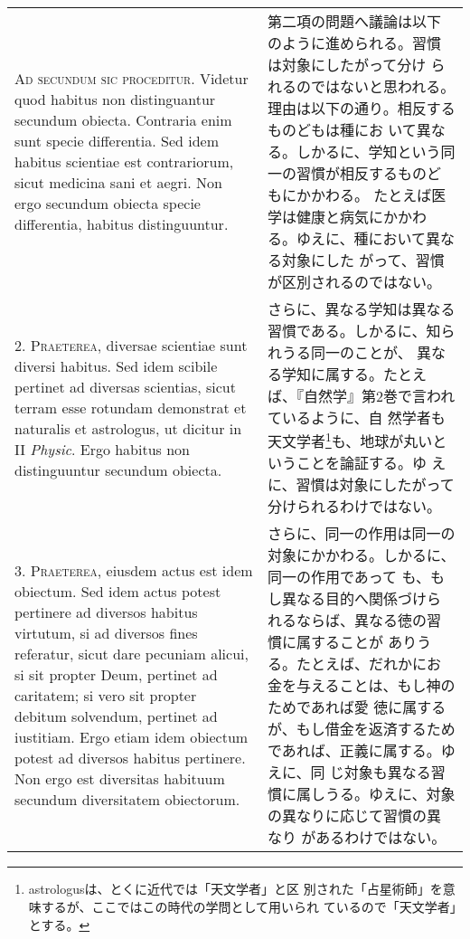 \documentclass[10pt]{jsarticle}
\begin{document}
\begin{longtable}{p{21em}p{21em}}

{\scshape Ad secundum sic proceditur}. Videtur quod habitus non
distinguantur secundum obiecta. Contraria enim sunt specie
differentia. Sed idem habitus scientiae est contrariorum, sicut
medicina sani et aegri. Non ergo secundum obiecta specie differentia,
habitus distinguuntur.

&

第二項の問題へ議論は以下のように進められる。習慣は対象にしたがって分け
られるのではないと思われる。理由は以下の通り。相反するものどもは種にお
いて異なる。しかるに、学知という同一の習慣が相反するものどもにかかわる。
たとえば医学は健康と病気にかかわる。ゆえに、種において異なる対象にした
がって、習慣が区別されるのではない。

\\

2. {\scshape Praeterea}, diversae scientiae sunt diversi habitus. Sed
idem scibile pertinet ad diversas scientias, sicut terram esse
rotundam demonstrat et naturalis et astrologus, ut dicitur in II
{\itshape Physic}. Ergo habitus non distinguuntur secundum obiecta.

&

さらに、異なる学知は異なる習慣である。しかるに、知られうる同一のことが、
異なる学知に属する。たとえば、『自然学』第2巻で言われているように、自
然学者も天文学者\footnote{astrologusは、とくに近代では「天文学者」と区
別された「占星術師」を意味するが、ここではこの時代の学問として用いられ
ているので「天文学者」とする。}も、地球が丸いということを論証する。ゆ
えに、習慣は対象にしたがって分けられるわけではない。

\\

3. {\scshape Praeterea}, eiusdem actus est idem obiectum. Sed idem
actus potest pertinere ad diversos habitus virtutum, si ad diversos
fines referatur, sicut dare pecuniam alicui, si sit propter Deum,
pertinet ad caritatem; si vero sit propter debitum solvendum, pertinet
ad iustitiam. Ergo etiam idem obiectum potest ad diversos habitus
pertinere. Non ergo est diversitas habituum secundum diversitatem
obiectorum.

&

さらに、同一の作用は同一の対象にかかわる。しかるに、同一の作用であって
も、もし異なる目的へ関係づけられるならば、異なる徳の習慣に属することが
ありうる。たとえば、だれかにお金を与えることは、もし神のためであれば愛
徳に属するが、もし借金を返済するためであれば、正義に属する。ゆえに、同
じ対象も異なる習慣に属しうる。ゆえに、対象の異なりに応じて習慣の異なり
があるわけではない。


\end{longtable}
\end{document}

